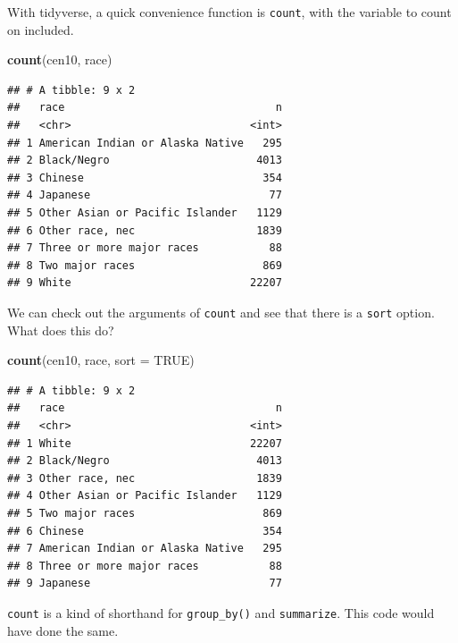 \documentclass[]{book}
\newenvironment{Shaded}{\begin{snugshade}}{\end{snugshade}}
\newcommand{\DataTypeTok}[1]{\textcolor[rgb]{0.13,0.29,0.53}{#1}}
\newcommand{\KeywordTok}[1]{\textcolor[rgb]{0.13,0.29,0.53}{\textbf{#1}}}
\newcommand{\NormalTok}[1]{#1}
\newcommand{\OperatorTok}[1]{\textcolor[rgb]{0.81,0.36,0.00}{\textbf{#1}}}
\newcommand{\OtherTok}[1]{\textcolor[rgb]{0.56,0.35,0.01}{#1}}
\newcommand{\StringTok}[1]{\textcolor[rgb]{0.31,0.60,0.02}{#1}}
\theoremstyle{definition}
\theoremstyle{definition}
\theoremstyle{definition}
\theoremstyle{remark}
\begin{document}
With tidyverse, a quick convenience function is \texttt{count}, with the variable to count on included.

\begin{Shaded}
\begin{Highlighting}[]
\KeywordTok{count}\NormalTok{(cen10, race)}
\end{Highlighting}
\end{Shaded}

\begin{verbatim}
## # A tibble: 9 x 2
##   race                                 n
##   <chr>                            <int>
## 1 American Indian or Alaska Native   295
## 2 Black/Negro                       4013
## 3 Chinese                            354
## 4 Japanese                            77
## 5 Other Asian or Pacific Islander   1129
## 6 Other race, nec                   1839
## 7 Three or more major races           88
## 8 Two major races                    869
## 9 White                            22207
\end{verbatim}

We can check out the arguments of \texttt{count} and see that there is a \texttt{sort} option. What does this do?

\begin{Shaded}
\begin{Highlighting}[]
\KeywordTok{count}\NormalTok{(cen10, race, }\DataTypeTok{sort =} \OtherTok{TRUE}\NormalTok{)}
\end{Highlighting}
\end{Shaded}

\begin{verbatim}
## # A tibble: 9 x 2
##   race                                 n
##   <chr>                            <int>
## 1 White                            22207
## 2 Black/Negro                       4013
## 3 Other race, nec                   1839
## 4 Other Asian or Pacific Islander   1129
## 5 Two major races                    869
## 6 Chinese                            354
## 7 American Indian or Alaska Native   295
## 8 Three or more major races           88
## 9 Japanese                            77
\end{verbatim}

\texttt{count} is a kind of shorthand for \texttt{group\_by()} and \texttt{summarize}. This code would have done the same.

\begin{Shaded}
\end{Shaded}
\end{document}

